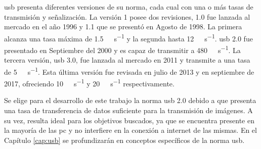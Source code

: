 \acrshort{usb} presenta diferentes versiones de su norma, cada cual con una o más tasas de transmisión y señalización. La versión 1 posee dos revisiones, 1.0 fue lanzada al mercado en el año 1996 y 1.1 que se presentó en Agosto de 1998. La primera alcanza una tasa máxima de \SI{1.5}{\mega\bit\per\second} y la segunda hasta \SI{12}{\mega\bit\per\second}. \acrshort{usb} 2.0 fue presentado en Septiembre del 2000 y es capaz de transmitir a \SI{480}{\mega\bit\per\second}. La tercera versión, \acrshort{usb} 3.0, fue lanzada al mercado en 2011 y transmite a una tasa de \SI{5}{\giga\bit\per\second}. Esta última versión fue revisada en julio de 2013 y en septiembre de 2017, ofreciendo \SI{10}{\giga\bit\per\second} y \SI{20}{\giga\bit\per\second} respectivamente.%


Se elige para el desarrollo de este trabajo la norma \acrshort{usb} 2.0 debido a que presenta una tasa de transferencia de datos suficiente para la transmisión de imágenes. A su vez, resulta ideal para los objetivos buscados, ya que se encuentra presente en la mayoría de las \acrshort{pc} y no interfiere en la conexión a internet de las mismas. En el Capítulo \ref{cap:usb} se profundizarán en conceptos específicos de la norma \acrshort{usb}.%

